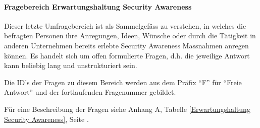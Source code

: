 \documentclass[../../main.tex]{subfiles}
\begin{document}
\paragraph*{Fragebereich Erwartungshaltung Security Awareness}\mbox{}

\begin{sloppypar}
Dieser letzte Umfragebereich ist als Sammelgefäss zu verstehen, in welches die befragten Personen ihre Anregungen, Ideen, Wünsche oder durch die Tätigkeit in anderen Unternehmen bereits erlebte Security Awareness Massnahmen anregen können. Es handelt sich um offen formulierte Fragen, d.h. die jeweilige Antwort kann beliebig lang und unstrukturiert sein.

Die ID's der Fragen zu diesem Bereich werden aus dem Präfix "`F"' für "`Freie Antwort"' und der fortlaufenden Fragenummer gebildet.

Für eine Beschreibung der Fragen siehe Anhang A, Tabelle \ref{Erwartungshaltung Security Awareness}, Seite \pageref{Erwartungshaltung Security Awareness}.
\end{sloppypar}
\end{document}
